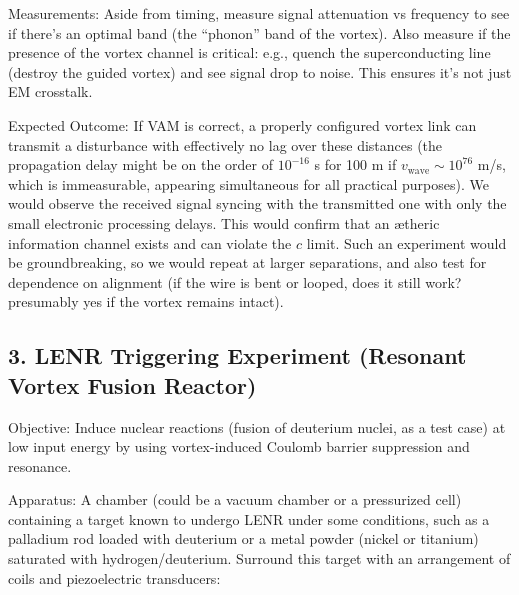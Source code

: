 Measurements: Aside from timing, measure signal attenuation vs frequency to see if there's an optimal band (the “phonon” band of the vortex). Also measure if the presence of the vortex channel is critical: e.g., quench the superconducting line (destroy the guided vortex) and see signal drop to noise. This ensures it’s not just EM crosstalk.


Expected Outcome: If VAM is correct, a properly configured vortex link can transmit a disturbance with effectively no lag over these distances (the propagation delay might be on the order of $10^{-16}$ s for 100 m if $v_\text{wave}\sim10^{76}$ m/s, which is immeasurable, appearing simultaneous for all practical purposes). We would observe the received signal syncing with the transmitted one with only the small electronic processing delays. This would confirm that an ætheric information channel exists and can violate the $c$ limit. Such an experiment would be groundbreaking, so we would repeat at larger separations, and also test for dependence on alignment (if the wire is bent or looped, does it still work? presumably yes if the vortex remains intact).


\subsection*{3. LENR Triggering Experiment (Resonant Vortex Fusion Reactor)}

Objective: Induce nuclear reactions (fusion of deuterium nuclei, as a test case) at low input energy by using vortex-induced Coulomb barrier suppression and resonance.


Apparatus: A chamber (could be a vacuum chamber or a pressurized cell) containing a target known to undergo LENR under some conditions, such as a palladium rod loaded with deuterium or a metal powder (nickel or titanium) saturated with hydrogen/deuterium. Surround this target with an arrangement of coils and piezoelectric transducers:



